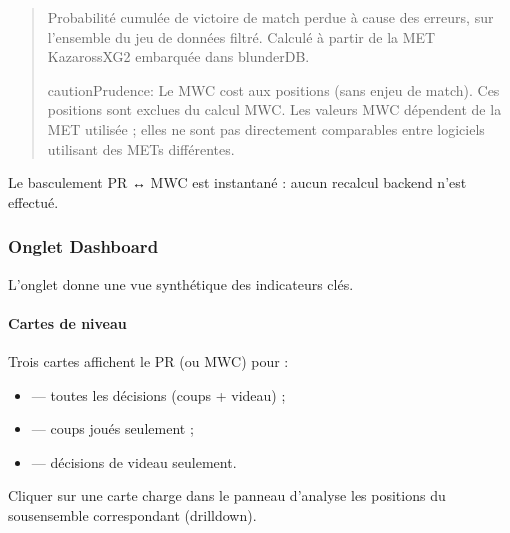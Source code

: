 \documentclass[letterpaper,10pt,french]{sphinxmanual}
\begin{document}
\sphinxAtStartPar
{}
\begin{quote}

\sphinxAtStartPar
Probabilité cumulée de victoire de match perdue à cause des erreurs, sur
l’ensemble du jeu de données filtré. Calculé à partir de la MET
Kazaross\sphinxhyphen{}XG2 embarquée dans blunderDB.

\begin{sphinxadmonition}{caution}{Prudence:}
\sphinxAtStartPar
Le MWC cost  aux positions  (sans
enjeu de match). Ces positions sont exclues du calcul MWC.
Les valeurs MWC dépendent de la MET utilisée ; elles ne sont pas
directement comparables entre logiciels utilisant des METs différentes.
\end{sphinxadmonition}
\end{quote}

\sphinxAtStartPar
Le basculement PR ↔ MWC est instantané : aucun recalcul backend n’est
effectué.


\subsubsection{Onglet Dashboard}
\label{\detokenize{manuel:onglet-dashboard}}
\sphinxAtStartPar
L’onglet  donne une vue synthétique des indicateurs clés.


\paragraph{Cartes de niveau}
\label{\detokenize{manuel:cartes-de-niveau}}
\sphinxAtStartPar
Trois cartes affichent le PR (ou MWC) pour :
\begin{itemize}
\item {} 
\sphinxAtStartPar
{} — toutes les décisions (coups + videau) ;

\item {} 
\sphinxAtStartPar
{} — coups joués seulement ;

\item {} 
\sphinxAtStartPar
{} — décisions de videau seulement.

\end{itemize}

\sphinxAtStartPar
Cliquer sur une carte charge dans le panneau d’analyse les positions du
sous\sphinxhyphen{}ensemble correspondant (drill\sphinxhyphen{}down).
\end{document}
